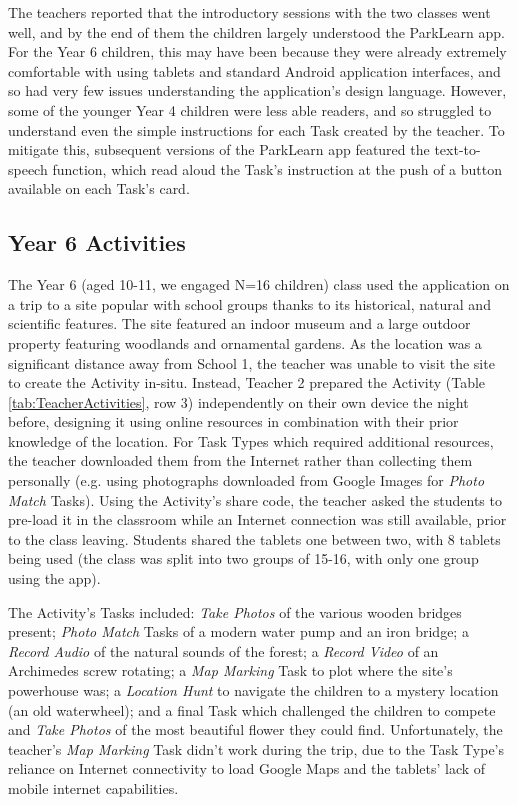 The teachers reported that the introductory sessions with the two classes went well, and by the end of them the children largely understood the ParkLearn app. For the Year 6 children, this may have been because they were already extremely comfortable with using tablets and standard Android application interfaces, and so had very few issues understanding the application’s design language. However, some of the younger Year 4 children were less able readers, and so struggled to understand even the simple instructions for each Task created by the teacher. To mitigate this, subsequent versions of the ParkLearn app featured the text-to-speech function, which read aloud the Task’s instruction at the push of a button available on each Task's card.

\subsection{Year 6 Activities}

The Year 6 (aged 10-11, we engaged N=16 children) class used the application on a trip to a site popular with school groups thanks to its historical, natural and scientific features. The site featured an indoor museum and a large outdoor property featuring woodlands and ornamental gardens. As the location was a significant distance away from School 1, the teacher was unable to visit the site to create the Activity in-situ. Instead, Teacher 2 prepared the Activity (Table \ref{tab:TeacherActivities}, row 3) independently on their own device the night before, designing it using online resources in combination with their prior knowledge of the location. For Task Types which required additional resources, the teacher downloaded them from the Internet rather than collecting them personally (e.g. using photographs downloaded from Google Images for \textit{Photo Match} Tasks). Using the Activity's share code, the teacher asked the students to pre-load it in the classroom while an Internet connection was still available, prior to the class leaving. Students shared the tablets one between two, with 8 tablets being used (the class was split into two groups of 15-16, with only one group using the app). 

The Activity's Tasks included: \textit{Take Photos} of the various wooden bridges present; \textit{Photo Match} Tasks of a modern water pump and an iron bridge; a \textit{Record Audio} of the natural sounds of the forest; a \textit{Record Video} of an Archimedes screw rotating; a \textit{Map Marking} Task to plot where the site's powerhouse was; a \textit{Location Hunt} to navigate the children to a mystery location (an old waterwheel); and a final Task which challenged the children to compete and \textit{Take Photos} of the most beautiful flower they could find. Unfortunately, the teacher's \textit{Map Marking} Task didn't work during the trip, due to the Task Type's reliance on Internet connectivity to load Google Maps and the tablets' lack of mobile internet capabilities.

